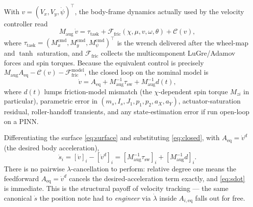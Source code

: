 \documentclass[11pt]{article}
\theoremstyle{plain}
\theoremstyle{definition}
\newcommand{\Vx}{V_x}
\newcommand{\Vy}{V_y}
\newcommand{\Maug}{M_{\mathrm{aug}}}
\begin{document}
With $v=(\Vx,\Vy,\dot\psi)^\top$, the body-frame dynamics actually used by the
velocity controller read
\begin{equation}
\Maug\,\dot v=\tau_{\mathrm{task}}+\mathcal{F}_{\mathrm{fric}}(\chi,\mu,v,\omega,\theta)
+\mathcal{C}(v),
\label{eq:plant}
\end{equation}
where $\tau_{\mathrm{task}}=(M_x^{\mathrm{cmd}},M_y^{\mathrm{cmd}},
M_\psi^{\mathrm{cmd}})^\top$ is the wrench delivered after the wheel-map and
$\tanh$ saturation, and $\mathcal{F}_{\mathrm{fric}}$ collects the multicomponent
LuGre/Adamov forces and spin torques. Because the equivalent control is precisely
$\Maug A_{\mathrm{eq}}-\mathcal{C}(v)-\mathcal{F}^{\mathrm{model}}_{\mathrm{fric}}$,
the closed loop on the nominal model is
\begin{equation}
\dot v=A_{\mathrm{eq}}+\Maug^{-1}\tau_{\mathrm{sw}}+\Maug^{-1}d(t),
\label{eq:closed}
\end{equation}
where $d(t)$ lumps friction-model mismatch (the $\chi$-dependent spin torque
$M_{zi}$ in particular), parametric error in $(m_s,I_s,J_1,p_1,p_2,a_X,a_Y)$,
actuator-saturation residual, roller-handoff transients, and any state-estimation
error if run open-loop on a PINN.

Differentiating the surface \eqref{eq:surface} and substituting
\eqref{eq:closed}, with $A_{\mathrm{eq}}=\dot v^{d}$ (the desired body acceleration),
\begin{equation}
\dot s_i=[\dot v]_i-[\dot v^{d}]_i
=[\Maug^{-1}\tau_{\mathrm{sw}}]_i+[\Maug^{-1}d]_i .
\label{eq:sdot}
\end{equation}
There is no pairwise $\lambda$-cancellation to perform: relative degree one means the
feedforward $A_{\mathrm{eq}}=\dot v^{d}$ cancels the desired-acceleration term
exactly, and \eqref{eq:sdot} is immediate. This is the structural payoff of velocity
tracking --- the same canonical $\dot s$ the position note had to \emph{engineer}
via $\dot\lambda$ inside $A_{i,\mathrm{eq}}$ falls out for free.
\end{document}
